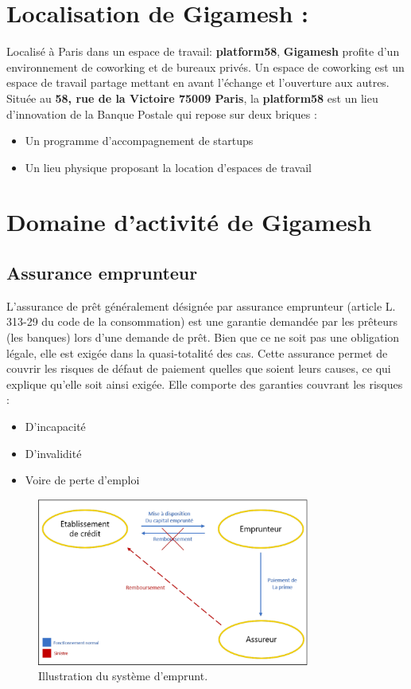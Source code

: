\section{Localisation de Gigamesh :}

Localisé à Paris dans un espace de travail: \textbf{platform58}, \textbf{Gigamesh } profite d’un environnement de coworking et de bureaux privés. Un espace de coworking est un espace de travail partage mettant en avant l’échange et l’ouverture aux autres. Située au \textbf{58, rue de la Victoire 75009 Paris}, la \textbf{platform58} est un lieu d’innovation de la Banque Postale qui
repose sur deux briques :
\begin{itemize}
	\item Un programme d’accompagnement de startups
	\item Un lieu physique proposant la location d’espaces de travail
\end{itemize}

\section{Domaine d’activité de Gigamesh}
\subsection{Assurance emprunteur}

L’assurance de prêt généralement désignée par assurance emprunteur (article L. 313-29 du code de la
consommation) est une garantie demandée par les prêteurs (les banques) lors d’une demande de prêt.
Bien que ce ne soit pas une obligation légale, elle est exigée dans la quasi-totalité des cas. Cette assurance permet de couvrir les risques de défaut de paiement quelles que soient leurs causes, ce qui explique qu’elle soit ainsi exigée. Elle comporte des garanties couvrant les risques :
\begin{itemize}
	\item D’incapacité
	\item D’invalidité
	\item Voire de perte d’emploi
\end{itemize}

\begin{figure}[!th]
\centering
\includegraphics[width=0.8\textwidth]{Figures/emprunteur}
\decoRule
\caption[Illustration du système d'emprunt]{Illustration du système d'emprunt.}
\label{fig:Emprunt}
\end{figure}
\newpage
